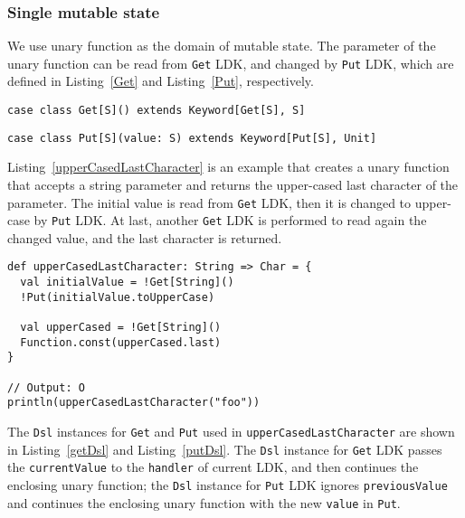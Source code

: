 \subsubsection{Single mutable state}\label{Single mutable state}

We use unary function as the domain of mutable state. The parameter of the unary function can be read from \lstinline{Get} LDK, and changed by \lstinline{Put} LDK, which are defined in Listing~\ref{Get} and Listing~\ref{Put}, respectively.

\begin{lstlisting}[caption={The definition of \lstinline{Get} LDK},label={Get}]
case class Get[S]() extends Keyword[Get[S], S]
\end{lstlisting}

\begin{lstlisting}[caption={The definition of \lstinline{Put} LDK},label={Put}]
case class Put[S](value: S) extends Keyword[Put[S], Unit]
\end{lstlisting}

Listing~\ref{upperCasedLastCharacter} is an example that creates a unary function that accepts a string parameter and returns the upper-cased last character of the parameter. The initial value is read from \lstinline{Get} LDK, then it is changed to upper-case by \lstinline{Put} LDK. At last, another \lstinline{Get} LDK is performed to read again  the changed value, and the last character is returned.

\begin{lstlisting}[caption={Using \lstinline{Get} and \lstinline{Put} in a unary function},label={upperCasedLastCharacter}]
def upperCasedLastCharacter: String => Char = {
  val initialValue = !Get[String]()
  !Put(initialValue.toUpperCase)

  val upperCased = !Get[String]()
  Function.const(upperCased.last)
}

// Output: O
println(upperCasedLastCharacter("foo"))
\end{lstlisting}

The \lstinline{Dsl} instances for \lstinline{Get} and \lstinline{Put} used in \lstinline{upperCasedLastCharacter} are shown in Listing~\ref{getDsl} and Listing~\ref{putDsl}. The \lstinline{Dsl} instance for \lstinline{Get} LDK passes the \lstinline{currentValue} to the \lstinline{handler} of current LDK, and then continues the enclosing unary function; the \lstinline{Dsl} instance for \lstinline{Put} LDK ignores \lstinline{previousValue} and continues the enclosing unary function with the new \lstinline{value} in \lstinline{Put}.

